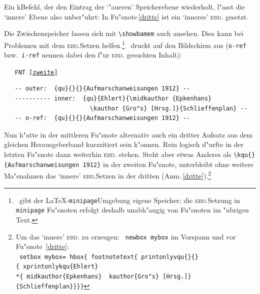 \documentclass[12pt,a4paper]{article}
\newcommand{\pbs}{\string\ \unskip}
\newcommand{\bs}{\protect\pbs}
\begin{document}
\vspace{.5ex}\noindent
Ein k\fhy Befehl, der den Eintrag der `"au\hyss eren' Speicherebene wiederholt, 
l"asst die `innere' Ebene also unber"uhrt: In Fu"snote\,\ref{dritte} ist 
ein `inneres' \textsc{ebd.} gesetzt. 

Die Zwischenspeicher lassen sich mit \verb|\showbamem| auch ansehen. 
Dies kann bei Problemen mit dem \textsc{ebd.}\hy Setzen
helfen.\footnote{\BibArts\ gibt der \LaTeX-\texttt{minipage}\hy Umgebung 
eigene Speicher; die \textsc{ebd.}\hy Setzung in \texttt{minipage}\hy
Fu"snoten erfolgt deshalb unabh"angig von Fu"snoten im "ubrigen Text.}
\BibArts\ druckt auf den Bildschirm aus (\verb|o-ref| bzw.\ \verb|i-ref| nennen 
dabei den f"ur \textsc{ebd.} gesuchten Inhalt):

{\scriptsize\vspace{3ex}\noindent
\verb|   FNT |\texttt{\ref{zweite}}
\vspace{-3ex}
\begin{verbatim}
   -- outer:  {qu}{}{}{Aufmarschanweisungen 1912} -- 
   ---------- inner:  {qu}{Ehlert}{\midkauthor {Epkenhans}
                        \kauthor {Gro"s} [Hrsg.]}{Schlieffenplan} -- 
   -- o-ref:  {qu}{}{}{Aufmarschanweisungen 1912} -- 
\end{verbatim}}


\vspace{-.5ex}\noindent
Nun h"atte in der mittleren Fu"snote alternativ auch ein dritter Aufsatz aus dem gleichen
Herausgeberband kurzzitiert sein k"onnen. Rein logisch d"urfte in der letzten 
Fu"snote dann weiterhin \textsc{ebd.} stehen. Steht aber etwas Anderes als 
\verb|\kqu{}{Aufmarschanweisungen 1912}| in der 
zweiten Fu"snote, unterbleibt ohne weitere Ma"snahmen das `innere' \textsc{ebd.}\hy Setzen in 
der dritten (Anm.\,\ref{dritte}).\footnote{Um das `innere' \textsc{ebd.} zu erzeugen:
\texttt{\bs newbox\bs mybox} im Vorspann und vor Fu"snote~\ref{dritte}:
\\[.3ex] \hspace*{.75em} \texttt{\bs setbox\bs mybox=\bs hbox\{\bs footnotetext\{\bs printonlyvqu\{\}\{\}
\\ \hspace*{1em} \{\bs xprintonlykqu\{Ehlert\} 
\\ \hspace*{1.5em} *\{\bs midkauthor\{Epkenhans\} \bs kauthor\{Gro"s\} [Hrsg.]\}
\\ \hspace*{1.5em} \{Schlieffenplan\}\}\}\}}}
\end{document}
